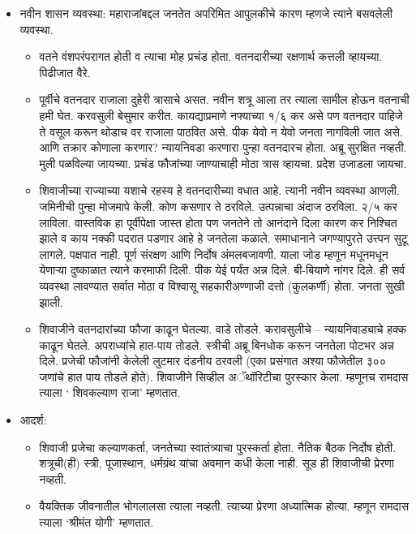\begin{itemize}
\item नवीन शासन व्यवस्था: महाराजांबद्दल जनतेत अपरिमित आपुलकीचे कारण म्हणजे त्याने बसवलेली व्यवस्था.
	\begin{itemize}
	\item वतने वंशपरंपरागत होती व त्याचा मोह प्रचंड होता. वतनदारीच्या रक्षणार्थ कत्तली व्हायच्या. पिढीजात वैरे. 
	\item पूर्वीचे वतनदार राजाला दुहेरी त्रासाचे असत. नवीन शत्रू आला तर त्याला सामील होऊन वतनाची हमी घेत. करवसुली बेसुमार करीत. कायद्याप्रमाणे नफ्याच्या १/६ कर असे पण वतनदार पाहिजे ते वसूल करून थोडाच वर राजाला पाठवित असे. पीक येवो न येवो जनता नागविली जात असे. आणि तक्रार कोणाला करणार? न्यायनिवडा करणारा पुन्हा वतनदारच होता. अब्रू सुरक्षित नव्हती. मुली पळविल्या जायच्या. प्रचंड फौजांच्या जाण्याचाही मोठा त्रास व्हायचा. प्रदेश उजाडला जायचा.
	\item शिवाजीच्या राज्याच्या यशाचे रहस्य हे वतनदारीच्या वधात आहे. त्यानी नवीन व्यवस्था आणली. जमिनीची पुन्हा मोजमापे केली. कोण कसणार ते ठरविले. उत्पन्नाचा अंदाज ठरविला. २/५ कर लाविला. वास्तविक हा पूर्वीपेक्षा जास्त होता पण जनतेने तो आनंदाने दिला कारण कर निश्चित झाले व काय नक्की पदरात पडणार आहे हे जनतेला कळाले. समाधानाने जगण्यापुरते उत्त्पन सुटू लागले. पक्षपात नाही. पूर्ण संरक्षण आणि निर्दोष अंमलबजावणी. याला जोड म्हणून मधूनमधून येणाऱ्या दुष्काळात त्याने करमाफी दिली. पीक येई पर्यंत अन्न दिले. बी-बियाणे नांगर दिले. ही सर्व व्यवस्था लावण्यात सर्वात मोठा व विश्वासू सहकारीअण्णाजी दत्तो (कुलकर्णी) होता. जनता सुखी झाली.
	\item शिवाजीने वतनदारांच्या फौजा काढून घेतल्या. वाडे तोडले. करावसुलीचे – न्यायनिवाड्याचे हक्क काढून घेतले. अपराध्यांचे हात-पाय तोडले. स्त्रीची अब्रू बिनधोक करून जनतेला पोटभर अन्न दिले. प्रजेची फौजांनी केलेली लुटमार दंडनीय ठरवली (एका प्रसंगात अश्या फौजेतील ३०० जणांचे हात पाय तोडले होते). शिवाजीने सिव्हील अॅथॉरिटीचा पुरस्कार केला. म्हणूनच रामदास त्याला ‘ शिवकल्याण राजा’ म्हणतात.
	\end{itemize}

\item	आदर्श: 
	\begin{itemize}
	\item शिवाजी प्रजेचा कल्याणकर्ता, जनतेच्या स्वातंत्र्याचा पुरस्कर्ता होता. नैतिक बैठक निर्दोष होती. शत्रूची(ही) स्त्री, पूजास्थान, धर्मग्रंथ यांचा अवमान कधी केला नाही. सूड ही शिवाजीची प्रेरणा नव्हती.
	\item वैयक्तिक जीवनातील भोगलालसा त्याला नव्हती. त्याच्या प्रेरणा अध्यात्मिक होत्या. म्हणून रामदास त्याला ‘श्रीमंत योगी’ म्हणतात.
	\end{itemize}

\end{itemize}
